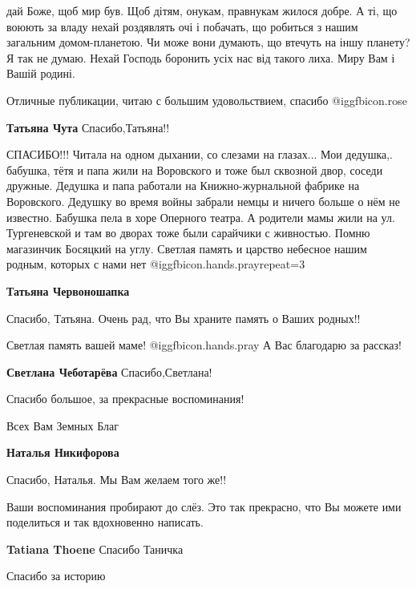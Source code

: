 \begin{itemize}
\begin{itemize}
дай Боже, щоб мир був. Щоб дітям, онукам, правнукам жилося добре. А ті, що
воюють за владу нехай роздявлять очі і побачать, що робиться з нашим загальним
домом-планетою. Чи може вони думають, що втечуть на іншу планету? Я так не
думаю. Нехай Господь боронить усіх нас від такого лиха. Миру Вам і Вашій
родині.

\end{itemize} %

Отличные публикации, читаю с большим удовольствием, спасибо  @igg{fbicon.rose} 

\textbf{Татьяна Чута} Спасибо,Татьяна!!


СПАСИБО!!! Читала на одном дыхании, со слезами на глазах... Мои
дедушка,. бабушка, тётя и папа жили на Воровского и тоже был сквозной
двор, соседи дружные. Дедушка и папа работали на Книжно-журнальной фабрике на
Воровского. Дедушку во время войны забрали немцы и ничего больше о нём не
известно. Бабушка пела в хоре Оперного театра. А родители мамы жили на
ул. Тургеневской и там во дворах тоже были сарайчики с живностью. Помню
магазинчик Босяцкий на углу. Светлая память и царство небесное нашим родным,
которых с нами нет @igg{fbicon.hands.pray}{repeat=3} 

\textbf{Татьяна Червоношапка} 

Спасибо, Татьяна. Очень рад, что Вы храните память о Ваших родных!!

Светлая память вашей маме!  @igg{fbicon.hands.pray}  А Вас благодарю за рассказ!

\textbf{Светлана Чеботарёва} Спасибо,Светлана!

Спасибо большое, за прекрасные воспоминания!

Всех
Вам
Земных
Благ

\textbf{Наталья Никифорова} 

Спасибо, Наталья. Мы Вам желаем того же!!


Ваши воспоминания пробирают до слёз. Это так прекрасно, что Вы можете ими
поделиться и так вдохновенно написать.

\textbf{Tatiana Thoene} Спасибо Таничка

Спасибо за историю


\end{itemize}
